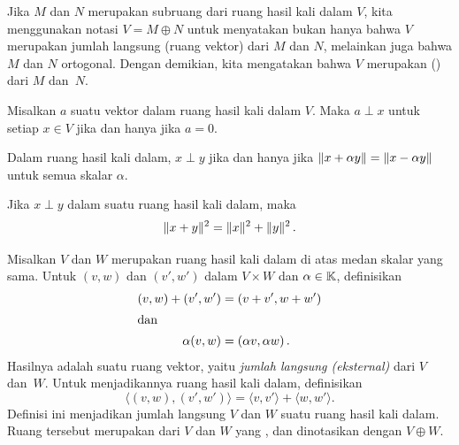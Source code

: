 \begin{defn} Jika $M$ dan $N$ merupakan subruang dari ruang hasil kali dalam $V$, kita menggunakan notasi
$V = M \oplus N$ untuk menyatakan bukan hanya bahwa $V$ merupakan jumlah langsung (ruang vektor) dari $M$
dan $N$, melainkan juga bahwa $M$ dan $N$ ortogonal. Dengan demikian, kita mengatakan bahwa $V$ merupakan
 () dari $M$ dan~$N$.
\end{defn}

\begin{prop} Misalkan $a$ suatu vektor dalam ruang hasil kali dalam $V$. Maka $a \perp x$ untuk setiap
$x \in V$ jika dan hanya jika $a = 0$.
\end{prop}

\begin{prop} Dalam ruang hasil kali dalam, $x \perp y$ jika dan hanya jika $\lVert x + \alpha y\rVert = \lVert x - \alpha y\rVert$
untuk semua skalar $\alpha$.
\end{prop}

\begin{prop}\label{00015037} Jika $x \perp y$ dalam suatu ruang hasil
kali dalam, maka
   \[ \lVert x + y\rVert^2 = \lVert x\rVert^2 + \lVert y\rVert^2\,. \]
\end{prop}

\begin{defn}\label{0001504} Misalkan $V$ dan $W$ merupakan ruang hasil kali dalam di atas medan skalar yang sama. Untuk $(v,w)$ dan
$(v',w')$ dalam $V \times W$ dan $\alpha \in \mathbb{K}$, definisikan
 \begin{align*}
      (v,w) + (v',w') &= (v + v', w + w') \\
\intertext{dan}
         \alpha(v,w) &= (\alpha v,\alpha w)\,.
 \end{align*}
Hasilnya adalah suatu ruang vektor, yaitu \emph{jumlah langsung (eksternal)} dari $V$ dan~$W$.
Untuk menjadikannya ruang hasil kali dalam, definisikan
   \[ \langle (v,w),(v',w') \rangle = \langle v,v' \rangle + \langle w,w' \rangle. \]
Definisi ini menjadikan jumlah langsung $V$ dan $W$ suatu ruang hasil kali dalam. Ruang tersebut merupakan
 dari $V$ dan $W$ yang , dan dinotasikan dengan $V \oplus W$.
\end{defn}

